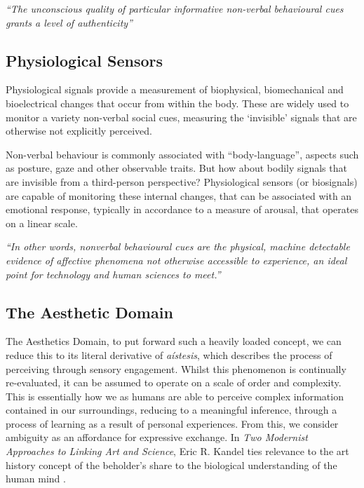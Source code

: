 \textit{“The unconscious quality of particular informative non-verbal behavioural cues grants a level of authenticity”}  \cite{pentland_honest_2010}

\subsection{Physiological Sensors}

Physiological signals provide a measurement of biophysical, biomechanical and bioelectrical changes that occur from within the body. These are widely used to monitor a variety non-verbal social cues, measuring the ‘invisible’ signals that are otherwise not explicitly perceived.

Non-verbal behaviour is commonly associated with “body-language”, aspects such as posture, gaze and other observable traits. But how about bodily signals that are invisible from a third-person perspective? Physiological sensors (or biosignals) are capable of monitoring these internal changes, that can be associated with an emotional response, typically in accordance to a measure of arousal, that operates on a linear scale.

\textit{“In other words, nonverbal behavioural cues are the physical, machine detectable evidence of affective phenomena not otherwise accessible to experience, an ideal point for technology and human sciences to meet.”}

 \cite{vinciarelli_towards_2011}


\subsection{The Aesthetic Domain}

The Aesthetics Domain, to put forward such a heavily loaded concept, we can reduce this to its literal derivative of \textit{aístesis}, which describes the process of perceiving through sensory engagement. Whilst this phenomenon is continually re-evaluated, it can be assumed to operate on a scale of order and complexity. This is essentially how we as humans are able to perceive complex information contained in our surroundings, reducing to a meaningful inference, through a process of learning as a result of personal experiences. From this, we consider ambiguity as an affordance for expressive exchange. In \textit{Two Modernist Approaches to Linking Art and Science}, Eric R. Kandel ties relevance to the art history concept of the beholder's share to the biological understanding of the human mind \cite{kandel_two_2013}.


